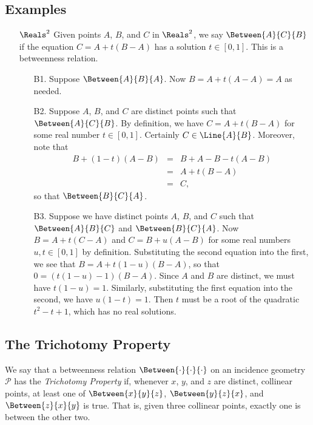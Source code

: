 \documentclass{article}
\begin{document}
\subsection*{Examples}

\begin{itemize}
\item[$\Reals^2$] Given points $A$, $B$, and $C$ in $\Reals^2$, we say $\Between{A}{C}{B}$ if the equation $C = A + t(B-A)$ has a solution $t \in [0,1]$. This is a betweenness relation.
\begin{itemize}
\item[B1.] Suppose $\Between{A}{B}{A}$. Now $B = A + t(A - A) = A$ as needed.
\item[B2.] Suppose $A$, $B$, and $C$ are distinct points such that $\Between{A}{C}{B}$. By definition, we have $C = A + t(B-A)$ for some real number $t \in [0,1]$. Certainly $C \in \Line{A}{B}$. Moreover, note that
\begin{eqnarray*}
B + (1-t)(A-B) & = & B + A - B - t(A-B) \\
 & = & A + t(B-A) \\
 & = & C,
\end{eqnarray*}
so that $\Between{B}{C}{A}$.
\item[B3.] Suppose we have distinct points $A$, $B$, and $C$ such that $\Between{A}{B}{C}$ and $\Between{B}{C}{A}$.
Now $B = A + t(C-A)$ and $C = B + u(A-B)$ for some real numbers $u,t \in [0,1]$ by definition.
Substituting the second equation into the first, we see that $B = A + t(1-u)(B - A)$, so that $0 = (t(1-u) - 1)(B - A)$. Since $A$ and $B$ are distinct, we must have $t(1-u) = 1$. Similarly, substituting the first equation into the second, we have $u(1-t) = 1$. Then $t$ must be a root of the quadratic $t^2 - t + 1$, which has no real solutions.
\end{itemize}
\end{itemize}



\subsection*{The Trichotomy Property}

\begin{dfn}
We say that a betweenness relation $\Between{\cdot}{\cdot}{\cdot}$ on an incidence geometry $\mathcal{P}$ has the \emph{Trichotomy Property} if, whenever $x$, $y$, and $z$ are distinct, collinear points, at least one of $\Between{x}{y}{z}$, $\Between{y}{z}{x}$, and $\Between{z}{x}{y}$ is true. That is, given three collinear points, exactly one is between the other two.
\end{dfn}
\end{document}
